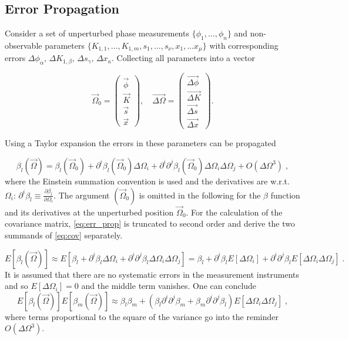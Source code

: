 \subsection{Error Propagation}

Consider a set of unperturbed phase measurements $ \{\phi_1, \ldots, \phi_n\} $ and non-observable  parameters $  \{ K_{1,1} , \ldots , K_{1,m}, s_1, \ldots, s_{\nu}, x_1, \ldots x_{\mu} \} $ with corresponding errors $ \Delta \phi_\alpha,\, \Delta K_{1,\beta}, \,\Delta s_\gamma,\, \Delta x_\kappa  $.
Collecting all parameters into a vector

\begin{equation}
\vec{\Omega}_0 =
\begin{pmatrix}
\vec{\phi}\\
\vec{K}\\
\vec{s}\\
\vec{x}
\end{pmatrix},\quad
\vec{\Delta \Omega} = 
\begin{pmatrix}
\vec{\Delta\phi}\\
\vec{\Delta K}\\
\vec{\Delta s}\\
\vec{\Delta x}
\end{pmatrix}.
\end{equation}

Using a Taylor expansion the errors in these parameters can be propagated

\begin{equation}
\beta_l (\vec{\Omega}) = \beta_l(\vec{\Omega}_0) + \partial^i\beta_l(\vec{\Omega}_0)\Delta\Omega_i +  \partial^i\partial^j\beta_l(\vec{\Omega}_0)\Delta\Omega_i\Delta\Omega_j + O(\Delta\Omega^3)\;,
\label{eq:err_prop}
\end{equation}
where the Einstein summation convention is used and the derivatives are w.r.t. $ \Omega_i $: $ \partial^i\beta_l \equiv \frac{\partial \beta_l}{\partial \Omega_i} $.
The argument $ (\vec{\Omega}_0) $ is omitted in the following for the $ \beta $ function and its derivatives at the unperturbed position $ \vec{\Omega}_0 $. For the calculation of the covariance matrix,
\eqref{eq:err_prop} is truncated to second order and derive the two summands of \eqref{eq:cov} separately.

\begin{equation}
E[\beta_l(\vec{\Omega})] \approx E\left[   
\beta_l + \partial^i\beta_l\Delta\Omega_i +  \partial^i\partial^j\beta_l\Delta\Omega_i\Delta\Omega_j 
\right] =
\beta_l + \partial^i\beta_l E[\Delta\Omega_i] +  \partial^i\partial^j\beta_l E\left[\Delta\Omega_i\Delta\Omega_j \right]\;.
\end{equation} It is assumed that there are no systematic errors in the measurement instruments and so $ {E}[{\Delta\Omega_i}] =0$ and the middle term vanishes.
One can conclude
\begin{equation}
E[\beta_l(\vec{\Omega})]E[\beta_m(\vec{\Omega})] \approx \beta_l\beta_m +
 \left(\beta_l\partial^i\partial^j\beta_m +
 \beta_m\partial^i\partial^j\beta_l\right) E\left[\Delta\Omega_i\Delta\Omega_j \right]\;,
 \label{eq:Eb_Eb}
\end{equation} where terms proportional to the square of the variance go into the reminder $ O(\Delta\Omega^3) $.

